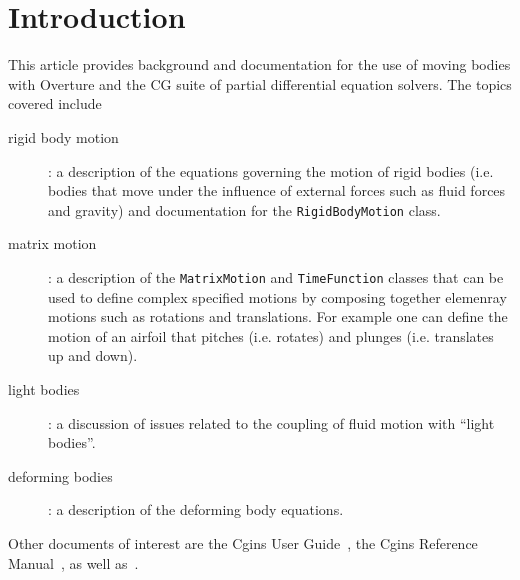 \documentclass[11pt]{article}
\begin{document}
\clearpage
\tableofcontents


\section{Introduction}\label{sec:intro}

  This article provides background and documentation for the use of moving bodies with Overture and the CG suite
of partial differential equation solvers. The topics covered include
\begin{description}
  \item[rigid body motion] : a description of the equations governing the motion of rigid bodies (i.e. bodies that move
     under the influence of external forces such as fluid forces and gravity) and documentation
      for the {\tt RigidBodyMotion} class.
  \item[matrix motion] : a description of the {\tt MatrixMotion} and {\tt TimeFunction} classes that can be used to
         define complex specified motions by composing together elemenray motions such as rotations and translations. For example
         one can define the motion of an airfoil that pitches (i.e. rotates) and plunges (i.e. translates
       up and down). 
  \item[light bodies] : a discussion of issues related to the coupling of fluid motion with ``light bodies''. 
  \item[deforming bodies] : a description of the deforming body equations.
\end{description}

Other documents of interest are the Cgins User Guide~\cite{CginsUserGuide}, the Cgins Reference Manual~\cite{CginsReferenceManual},
as well as~\cite{mog2006}. 



\clearpage



\clearpage


\clearpage


\clearpage




\end{document}
